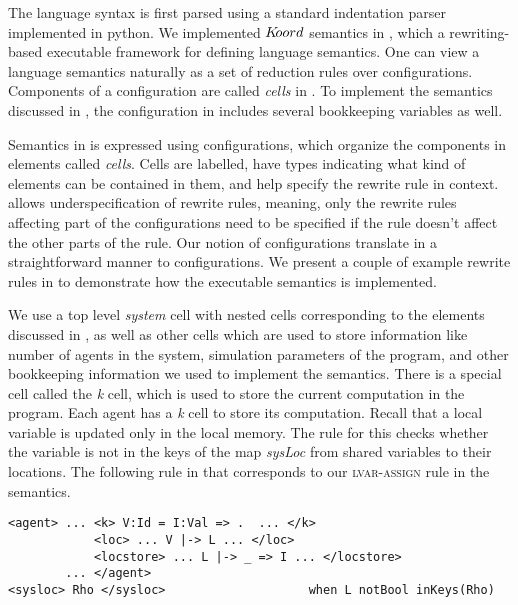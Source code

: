

The language syntax is first parsed using a standard indentation parser implemented in python. We implemented $K\kern-2pt oord$ semantics in \K, which a rewriting-based executable framework for defining language semantics. One can view a language semantics naturally as a set of reduction rules over configurations. Components of a configuration are called {\em cells} in \K. To implement the semantics discussed in , the configuration in \K includes several bookkeeping variables as well. 


Semantics in \K is expressed using configurations, which organize the components in elements called {\em cells}. Cells are labelled, have types indicating what kind of elements can be contained in them, and help specify the rewrite rule in context. \K allows underspecification of rewrite rules, meaning, only the rewrite rules affecting part of the configurations need to be specified if the rule doesn't affect the other parts of the rule. Our notion of configurations translate in a straightforward manner to \K configurations. We present a couple of example rewrite rules in \K to demonstrate how the executable semantics is implemented.  


We use a top level {\em system} cell with nested cells corresponding to the elements discussed in , as well as other cells which are used to store information like number of agents in the system, simulation parameters of the program, and other bookkeeping information we used to implement the semantics. There is a special cell called the {\em k} cell, which is used to store the current computation in the program. Each agent has a {\em k} cell to store its computation. Recall that a local variable is updated only in the local memory. The rule for this checks whether the variable is not in the keys of the map {\em sysLoc} from shared variables to their locations. The following rule in \K that corresponds to our \textsc{lvar-assign} rule in the semantics. 
\vspace{2pt}
\begin{mdframed}
\begin{Verbatim}[fontsize=\tiny]
<agent> ... <k> V:Id = I:Val => .  ... </k> 
            <loc> ... V |-> L ... </loc> 
            <locstore> ... L |-> _ => I ... </locstore> 
        ... </agent> 
<sysloc> Rho </sysloc>                    when L notBool inKeys(Rho)        
\end{Verbatim}
\end{mdframed}

